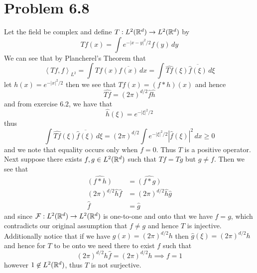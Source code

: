 \documentclass[12pt]{report}
\newcommand{\inner}[2]{\left\langle#1,#2\right\rangle}
\begin{document}
\section*{Problem 6.8}
Let the field be complex and define $T: L^2(\mathbb{R}^d) \to L^2(\mathbb{R}^d)$ by
\begin{equation*}
    Tf(x) = \int e^{-|x-y|^2/2}f(y) \, dy 
\end{equation*}
We can see that by Plancherel's Theorem that
\begin{equation*}
    \inner{Tf}{f}_{L^2} = \int Tf(x) \overline{f(x)}\, dx = \int \widehat{Tf}(\xi) \overline{\hat{f}(\xi)} \, d\xi
\end{equation*}
let $h(x) = e^{-|x|^2/2}$ then we see that $Tf(x) = (f*h)(x)$ and hence
\begin{equation*}
    \widehat{Tf} = (2\pi)^{d/2} \hat{f}\hat{h}
\end{equation*}
and from exercise $6.2$, we have that
\begin{equation*}
    \hat{h}(\xi) = e^{-|\xi|^2/2}
\end{equation*}
thus 
\begin{equation*}
    \int \widehat{Tf}(\xi) \overline{\hat{f}(\xi)} \, d\xi = (2\pi)^{d/2} \int e^{-|\xi|^2/2} |\hat{f}(\xi)|^2 \, dx \geq 0
\end{equation*}
and we note that equality occurs only when $f = 0$. Thus $T$ is a positive operator. Next suppose there exists $f,g \in L^2(\mathbb{R}^d)$ such that $Tf = Tg$ but $g \neq f$. Then we see that 
\begin{align*}
    \widehat{(f * h)} &= \widehat{(f*g)} \\
    (2\pi)^{d/2}\hat{h} \hat{f} &=(2\pi)^{d/2}\hat{h} \hat{g} \\
    \hat{f} &= \hat{g}
\end{align*}
and since $\mathcal{F}: L^2(\mathbb{R}^d) \to L^2(\mathbb{R}^d)$ is one-to-one and onto that we have $f = g$, which contradicts our original assumption that $f \neq g$ and hence $T$ is injective. Additionally notice that if we have $g(x) = (2\pi)^{d/2} h$ then $\hat{g}(\xi) = (2\pi)^{d/2} h$ and hence for $T$ to be onto we need there to exist $f$ such that
\begin{equation*}
    (2\pi)^{d/2}h \hat{f} = (2\pi)^{d/2}h \implies f = 1
\end{equation*}
however $1 \not\in L^2(\mathbb{R}^d)$, thus $T$ is not surjective.
\end{document}
